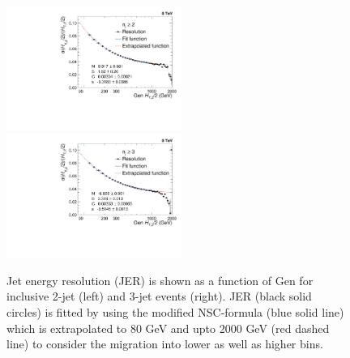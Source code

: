 \begin{figure}[!h]
 \begin{center}
 \hspace*{-5mm}\includegraphics[width=0.51\textwidth]{Plots_HT_2_150/Extrapolate_Sigma_Value_Res_2_crystal_range_ext.pdf}%
 ~~\includegraphics[width=0.51\textwidth]{Plots_HT_2_150/Extrapolate_Sigma_Value_Res_3_crystal_ext.pdf}
 \caption{Jet energy resolution (JER) is shown as a function of Gen \httwo for inclusive 2-jet (left) and 3-jet events (right). JER (black solid circles) is fitted by using the modified NSC-formula (blue solid line) which is extrapolated to 80 GeV and upto 2000 GeV (red dashed line) to consider the migration into lower as well as higher bins.}
    \label{fig:resolution}
  \end{center}
\end{figure}
 
